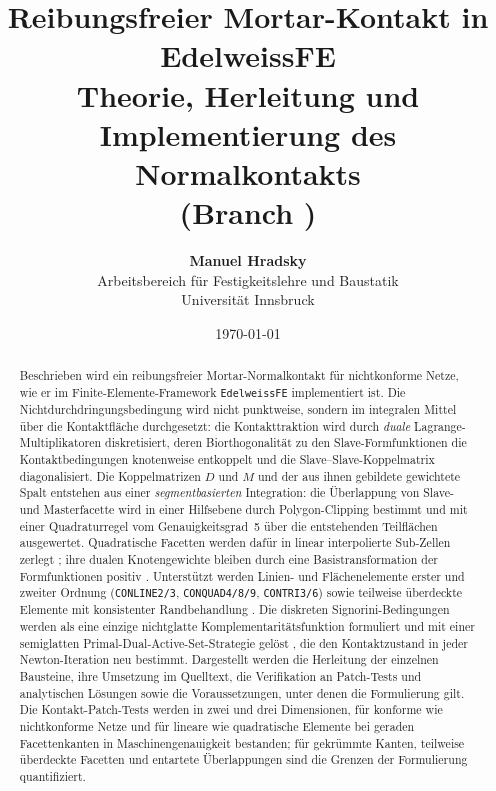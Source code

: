 \documentclass[a4paper,11pt]{article}
\title{\textbf{Reibungsfreier Mortar-Kontakt in EdelweissFE}\\
\large Theorie, Herleitung und Implementierung des Normalkontakts\\
\normalsize (Branch \code{0\_mortarcontact})}
\author{\textbf{Manuel Hradsky}\\
\small Arbeitsbereich f\"ur Festigkeitslehre und Baustatik\\
\small Universit\"at Innsbruck}
\date{\today}
\def\bm#1{#1}%
\newcommand{\code}[1]{\texttt{\small #1}}
\begin{document}
\maketitle

\begin{abstract}
Beschrieben wird ein reibungsfreier Mortar-Normalkontakt für nichtkonforme Netze, wie er im
Finite-Elemente-Framework \code{EdelweissFE} implementiert ist. Die Nichtdurchdringungsbedingung
wird nicht punktweise, sondern im integralen Mittel über die Kontaktfläche durchgesetzt: die
Kontakttraktion wird durch \emph{duale} Lagrange-Multiplikatoren \citep{wohlmuth2000} diskretisiert,
deren Biorthogonalität zu den Slave-Formfunktionen die Kontaktbedingungen knotenweise entkoppelt und
die Slave--Slave-Koppelmatrix diagonalisiert. Die Koppelmatrizen $\bm D$ und $\bm M$ und der aus
ihnen gebildete gewichtete Spalt entstehen aus einer \emph{segmentbasierten} Integration: die
Überlappung von Slave- und Masterfacette wird in einer Hilfsebene durch Polygon-Clipping
\citep{sutherland1974} bestimmt und mit einer Quadraturregel vom Genauigkeitsgrad~5
\citep{dunavant1985} über die entstehenden Teilflächen ausgewertet. Quadratische Facetten werden
dafür in linear interpolierte Sub-Zellen zerlegt \citep{puso2008}; ihre dualen Knotengewichte
bleiben durch eine Basistransformation der Formfunktionen positiv \citep{popp2012}. Unterstützt
werden Linien- und Flächenelemente erster und zweiter Ordnung (\code{CONLINE2/3},
\code{CONQUAD4/8/9}, \code{CONTRI3/6}) sowie teilweise überdeckte Elemente mit konsistenter
Randbehandlung \citep{cichosz}. Die diskreten Signorini-Bedingungen werden als eine einzige
nichtglatte Komplementaritätsfunktion \citep[Gl.~(55)]{gitterle} formuliert und mit einer
semiglatten Primal-Dual-Active-Set-Strategie gelöst \citep{hueber2005}, die den Kontaktzustand in
jeder Newton-Iteration neu bestimmt. Dargestellt werden die Herleitung der einzelnen Bausteine, ihre
Umsetzung im Quelltext, die Verifikation an Patch-Tests und analytischen Lösungen sowie die
Voraussetzungen, unter denen die Formulierung gilt. Die Kontakt-Patch-Tests werden in zwei und drei
Dimensionen, für konforme wie nichtkonforme Netze und für lineare wie quadratische Elemente bei
geraden Facettenkanten in Maschinengenauigkeit bestanden; für gekrümmte Kanten, teilweise
überdeckte Facetten und entartete Überlappungen sind die Grenzen der Formulierung quantifiziert.
\end{abstract}

\clearpage
\tableofcontents
\clearpage
\listoffigures
\clearpage
\end{document}
